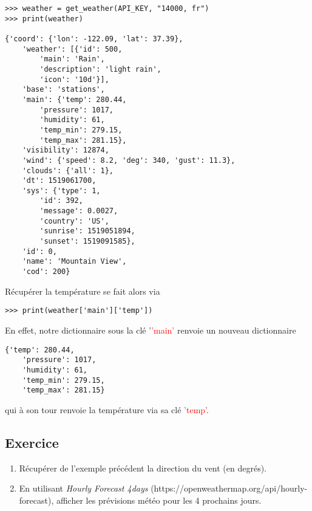\documentclass[12pt,fleqn]{book} %
\begin{document}
\begin{center}
	\begin{varwidth}[t]{.5\textwidth}
		\begin{lstlisting}[language=iPython,linewidth = 15cm]
>>> weather = get_weather(API_KEY, "14000, fr")
>>> print(weather)

{'coord': {'lon': -122.09, 'lat': 37.39},
	'weather': [{'id': 500,
		'main': 'Rain',
		'description': 'light rain',
		'icon': '10d'}],
	'base': 'stations',
	'main': {'temp': 280.44,
		'pressure': 1017,
		'humidity': 61,
		'temp_min': 279.15,
		'temp_max': 281.15},
	'visibility': 12874,
	'wind': {'speed': 8.2, 'deg': 340, 'gust': 11.3},
	'clouds': {'all': 1},
	'dt': 1519061700,
	'sys': {'type': 1,
		'id': 392,
		'message': 0.0027,
		'country': 'US',
		'sunrise': 1519051894,
		'sunset': 1519091585},
	'id': 0,
	'name': 'Mountain View',
	'cod': 200}\end{lstlisting}
\end{varwidth}\end{center}

Récupérer la température se fait alors via 

\begin{center}
	\begin{varwidth}[t]{.5\textwidth}
		\begin{lstlisting}[language=iPython,linewidth = 15cm]
>>> print(weather['main']['temp'])\end{lstlisting}
\end{varwidth}\end{center}

En effet, notre dictionnaire sous la clé '\textcolor{red}{'main'} renvoie un nouveau dictionnaire


\begin{center}
	\begin{varwidth}[t]{.5\textwidth}
		\begin{lstlisting}[language=iPython,linewidth = 15cm]
{'temp': 280.44,
	'pressure': 1017,
	'humidity': 61,
	'temp_min': 279.15,
	'temp_max': 281.15}\end{lstlisting}
\end{varwidth}\end{center}
qui à son tour renvoie la température via sa clé \textcolor{red}{'temp'}.

\subsection{Exercice}
\begin{enumerate}
	\item Récupérer de l'exemple précédent la direction du vent (en degrés).
	\item En utilisant \textit{Hourly Forecast 4days} (https://openweathermap.org/api/hourly-forecast), afficher les prévisions météo pour les 4 prochains jours.
\end{enumerate}
\end{document}
